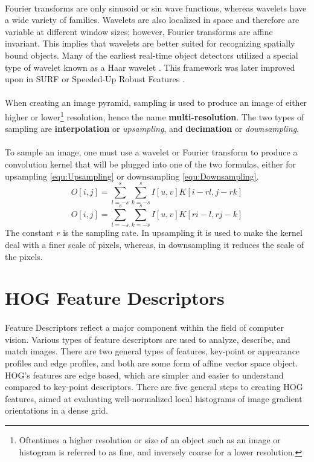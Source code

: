 \documentclass[11pt]{article}
\newcommand\simpleparagraph[1]{%
	\stepcounter{paragraph}\paragraph*{\theparagraph\quad{}#1}}
\renewcommand\theparagraph{}
\begin{document}
\simpleparagraph{}
Fourier transforms are only sinusoid or sin wave functions, whereas wavelets have a wide variety of families. Wavelets are also localized in space and therefore are variable at different window sizes; however, Fourier transforms are affine invariant. This implies that wavelets are better suited for recognizing spatially bound objects. Many of the earliest real-time object detectors utilized a special type of wavelet known as a Haar wavelet \cite{viola_rapid_2001}. This framework was later improved upon in SURF or Speeded-Up Robust Features \cite{bay_speeded-up_2008}.

\simpleparagraph{}
When creating an image pyramid, sampling is used to produce an image of either higher or lower\footnote{Oftentimes a higher resolution or size of an object such as an image or histogram is referred to as fine, and inversely coarse for a lower resolution.} resolution, hence the name \textbf{multi-resolution}. The two types of sampling are \textbf{interpolation} or \textit{upsampling}, and \textbf{decimation} or \textit{downsampling}.

\paragraph[Sampling]{}
To sample an image, one must use a wavelet or Fourier transform to produce a convolution kernel that will be plugged into one of the two formulas, either for upsampling \eqref{equ:Upsampling} or downsampling \eqref{equ:Downsampling}.
{\small
\begin{equation}\label{equ:Upsampling}
	O[i,j]= \sum_{l=-s}^{s}\sum_{k=-s}^{s} I[u,v]K[i-rl,j-rk]
\end{equation}
\begin{equation}\label{equ:Downsampling}
	O[i,j]= \sum_{l=-s}^{s}\sum_{k=-s}^{s} I[u,v]K[ri-l,rj-k]
\end{equation}
}
The constant $r$ is the sampling rate. In upsampling it is used to make the kernel deal with a finer scale of pixels, whereas, in downsampling it reduces the scale of the pixels.

\section{HOG Feature Descriptors}
\simpleparagraph{}
Feature Descriptors reflect a major component within the field of computer vision. Various types of feature descriptors are used to analyze, describe, and match images. There are two general types of features, key-point or appearance profiles and edge profiles, and both are some form of affine vector space object. HOG's features are edge based, which are simpler and easier to understand compared to key-point descriptors. There are five general steps to creating HOG features, aimed at evaluating well-normalized local histograms of image gradient orientations in a dense grid.
\end{document}

